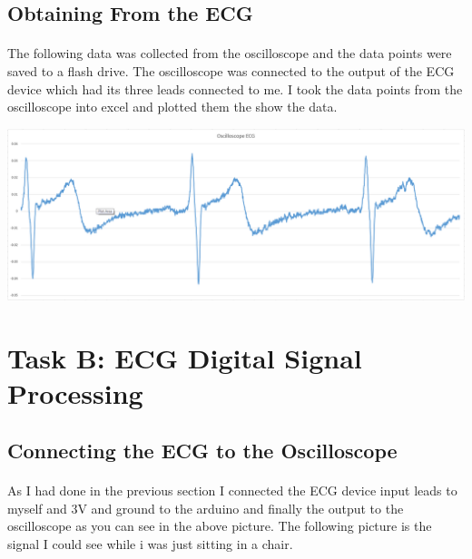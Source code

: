 \documentclass[12pt]{article}
\begin{document}
		\subsection{Obtaining From the ECG}
			\paragraph{}
				The following data was collected from the oscilloscope and the data points were saved
				 to a flash drive.  The oscilloscope was connected to the output of the ECG device which
				 had its three leads connected to me. I took the data points from the oscilloscope into 
				 excel and plotted them the show the data.
				 
			\begin{center}
				\includegraphics[scale=0.3]{oscope.png}\\
			\end{center}
	
	\section{Task B: ECG Digital Signal Processing}
		\subsection{Connecting the ECG to the Oscilloscope}
			\paragraph{}
				As I had done in the previous section I connected the ECG device input leads to myself 
				and 3V and ground to the arduino and finally the output to the oscilloscope as you can 
				see in the above picture.  The following picture is the signal I could see while i was just
				 sitting in a chair.		
				 
\end{document}
